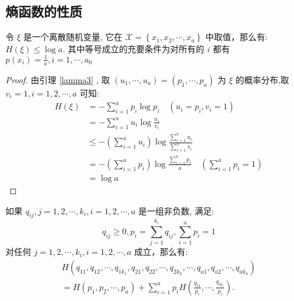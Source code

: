 \subsection{熵函数的性质}
\begin{theorem}[熵函数的最大值]\label{th1}
    令 $ \xi $ 是一个离散随机变量, 它在 $ \mathscr{X}=\left\{x_{1}, x_{2}, \cdots, x_{a}\right\} $ 中取值，那么有: $ H(\xi) \leqslant \log a. $ 其中等号成立的充要条件为对所有的 $ i $ 都有 $ p\left(x_{i}\right)=\frac{1}{a}, i=1, \cdots, a_{0} $
\end{theorem}

\begin{proof}
    由引理 \ref{lamma3} , 取 $ \left(u_{1}, \cdots, u_{a}\right)=\left(p_{1}, \cdots, p_{a}\right) $ 为 $ \xi $ 的概率分布,取 $ v_{i}=1, i=1,2, \cdots, a $ 可知:
$$
\begin{aligned}
H(\xi) & =-\sum_{i=1}^{a} p_{i} \log p_{i} \quad\left(u_{i}=p_{i}, v_{i}=1\right) \\
& =-\sum_{i=1}^{a} u_{i} \log \frac{u_{i}}{v_{i}} \\
& \leqslant-\left(\sum_{i=1}^{a} u_{i}\right) \log \frac{\sum\limits_{i=1}^{a} u_{i}}{\sum\limits_{i=1}^{a} v_{i}} \\
& =-\left(\sum\limits_{i=1}^{a} p_{i}\right) \log \frac{\sum\limits_{i=1}^{a} p_{i}}{a} \quad\left(\sum_{i=1}^{a} p_{i}=1\right) \\
& =\log a
\end{aligned}
$$
\end{proof}
\begin{theorem}[熵函数的可加性]\label{th2}
如果 $ q_{i j}, j=1,2, \cdots, k_{i}, i=1,2, \cdots, a $ 是一组非负数, 满足:
$$
q_{i j} \geqslant 0, p_{i}=\sum_{j=1}^{k_{i}} q_{i j}, \sum_{i=1}^{a} p_{i}=1
$$
对任何 $ j=1,2, \cdots, k_{i}, i=1,2, \cdots, a $ 成立，那么有:
$$
\begin{array}{l}
H\left(q_{11}, q_{12}, \cdots, q_{1 k_{1}}, q_{21}, q_{22}, \cdots, q_{2 k_{2}}, \cdots, q_{a 1}, q_{a 2}, \cdots, q_{a k_{a}}\right) \\
=H\left(p_{1}, p_{2}, \cdots, p_{a}\right)+\sum\limits_{i=1}^{a} p_{i} H\left(\frac{q_{i 1}}{p_{i}}, \cdots, \frac{q_{i k_{i}}}{p_{i}}\right) .
\end{array}
$$

\end{theorem}
